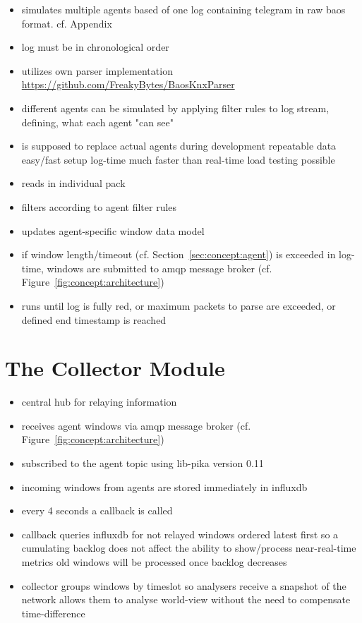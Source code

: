 \begin{itemize}
	\item simulates multiple agents based of one log containing telegram in raw \gls{baos} format. cf. Appendix~
	\item log must be in chronological order
	\item utilizes own parser implementation \url{https://github.com/FreakyBytes/BaosKnxParser}
	\item different agents can be simulated by applying filter rules to log stream, defining, what each agent "can see"
	\item is supposed to replace actual agents during development
		\subitem repeatable data
		\subitem easy/fast setup
		\subitem log-time much faster than real-time
		\subitem load testing possible
	\item reads in individual pack
	\item filters according to agent filter rules
	\item updates agent-specific window data model
	\item if window length/timeout (cf. Section~\ref{sec:concept:agent}) is exceeded in log-time, windows are submitted to \gls{amqp} message broker (cf. Figure~\ref{fig:concept:architecture})
	\item runs until log is fully red, or maximum packets to parse are exceeded, or defined end timestamp is reached
\end{itemize}

\section{The Collector Module}
\label{sec:impl:collector}

\begin{itemize}
	\item central hub for relaying information
	\item receives agent windows via \gls{amqp} message broker (cf. Figure~\ref{fig:concept:architecture})
	\item subscribed to the agent topic using \gls{lib-pika} version 0.11
	\item incoming windows from agents are stored immediately in \gls{influxdb}
	\item every 4 seconds a callback  is called
	\item callback queries \gls{influxdb} for not relayed windows
		\subitem ordered latest first
		\subitem so a cumulating backlog does not affect the ability to show/process near-real-time metrics
		\subitem old windows will be processed once backlog decreases
	\item collector groups windows by timeslot
		\subitem so analysers receive a snapshot of the network
		\subitem allows them to analyse world-view without the need to compensate time-difference
\end{itemize}

